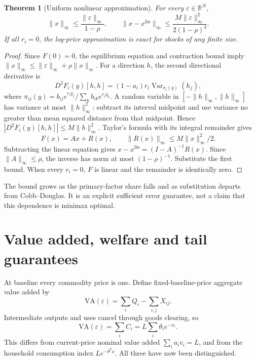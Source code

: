 \documentclass[11pt,a4paper]{article}
\newtheorem{theorem}{Theorem}[section]
\theoremstyle{definition}
\theoremstyle{remark}
\newcommand{\R}{\mathbb R}
\newcommand{\Var}{\operatorname{Var}}
\begin{document}
\begin{theorem}[Uniform nonlinear approximation]\label{th:approx}
For every $\varepsilon\in\R^N$,
\[
 \|x\|_\infty\leq\frac{\|\varepsilon\|_\infty}{1-\rho},\qquad
 \|x-x^{\mathrm{lin}}\|_\infty
 \leq\frac{M\|\varepsilon\|_\infty^2}{2(1-\rho)^3}.
\]
If all $r_i=0$, the log-price approximation is exact for shocks of any finite size.
\end{theorem}
\begin{proof}
Since $F(0)=0$, the equilibrium equation and contraction bound imply
$\|x\|_\infty\leq\|\varepsilon\|_\infty+\rho\|x\|_\infty$.
For a direction $h$, the second directional derivative is
\[
 D^2F_i(y)[h,h]=(1-a_i)r_i\Var_{\pi_i(y)}(h_j),
\]
where $\pi_{ij}(y)=b_{ij}e^{r_iy_j}/\sum_kb_{ik}e^{r_iy_k}$. A random variable in $[-\|h\|_\infty,\|h\|_\infty]$ has variance at most $\|h\|_\infty^2$: subtract its interval midpoint and use variance no greater than mean squared distance from that midpoint. Hence
$|D^2F_i(y)[h,h]|\leq M\|h\|_\infty^2$.
Taylor's formula with its integral remainder gives
\[
 F(x)=Ax+R(x),\qquad \|R(x)\|_\infty\leq M\|x\|_\infty^2/2.
\]
Subtracting the linear equation gives $x-x^{\mathrm{lin}}=(I-A)^{-1}R(x)$. Since $\|A\|_\infty\leq\rho$, the inverse has norm at most $(1-\rho)^{-1}$. Substitute the first bound. When every $r_i=0$, $F$ is linear and the remainder is identically zero.
\end{proof}

The bound grows as the primary-factor share falls and as substitution departs from Cobb--Douglas. It is an explicit sufficient error guarantee, not a claim that this dependence is minimax optimal.

\section{Value added, welfare and tail guarantees}
At baseline every commodity price is one. Define fixed-baseline-price aggregate value added by
\[
 \mathrm{VA}(\varepsilon)=\sum_iQ_i-\sum_{i,j}X_{ij}.
\]
Intermediate outputs and uses cancel through goods clearing, so
\begin{equation}\label{eq:va}
 \mathrm{VA}(\varepsilon)=\sum_iC_i=L\sum_i\theta_i e^{-x_i}.
\end{equation}
This differs from current-price nominal value added $\sum_i a_iv_i=L$, and from the household consumption index $L e^{-\theta^Tx}$. All three have now been distinguished.
\end{document}
